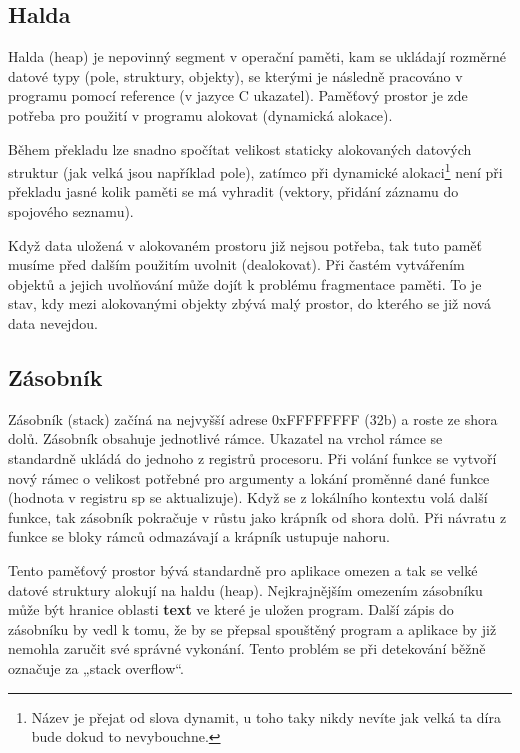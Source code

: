 \documentclass[FM,BP]{tulthesis}
\begin{document}
\subsection{Halda}
Halda (heap) je nepovinný segment v operační paměti, kam se ukládají rozměrné datové typy (pole, struktury, objekty), se kterými je následně pracováno v programu pomocí reference (v jazyce C ukazatel). Paměťový prostor je zde potřeba pro použití v programu alokovat (dynamická alokace). 

Během překladu lze snadno spočítat velikost staticky alokovaných datových struktur (jak velká jsou například pole), zatímco při dynamické alokaci\footnote{Název je přejat od slova dynamit, u toho taky nikdy nevíte jak velká ta díra bude dokud to nevybouchne.} není při překladu jasné kolik paměti se má vyhradit (vektory, přidání záznamu do spojového seznamu).

Když data uložená v alokovaném prostoru již nejsou potřeba, tak tuto paměť musíme před dalším použitím uvolnit (dealokovat). Při častém vytvářením objektů a jejich uvolňování může dojít k problému fragmentace paměti. To je stav, kdy mezi alokovanými objekty zbývá malý prostor, do kterého se již nová data nevejdou. 

\subsection{Zásobník}
Zásobník (stack) začíná na nejvyšší adrese 0xFFFFFFFF (32b) a roste ze shora dolů. Zásobník obsahuje jednotlivé rámce. Ukazatel na vrchol rámce se standardně ukládá do jednoho z registrů procesoru. Při volání funkce se vytvoří nový rámec o velikost potřebné pro argumenty a lokání proměnné dané funkce (hodnota v registru sp se aktualizuje). Když se z lokálního kontextu volá další funkce, tak zásobník pokračuje v růstu jako krápník od shora dolů. Při návratu z funkce se bloky rámců odmazávají a krápník ustupuje nahoru. 

\newpage
Tento paměťový prostor bývá standardně pro aplikace omezen a tak se velké datové struktury alokují na haldu (heap). Nejkrajnějším omezením zásobníku může být hranice oblasti \textbf{text} ve které je uložen program. Další zápis do zásobníku by vedl k tomu, že by se přepsal spouštěný program a aplikace by již nemohla zaručit své správné vykonání. Tento problém se při detekování běžně označuje za „stack overflow“. \cite{Javatpoint_SackVsHeap}
\end{document}

